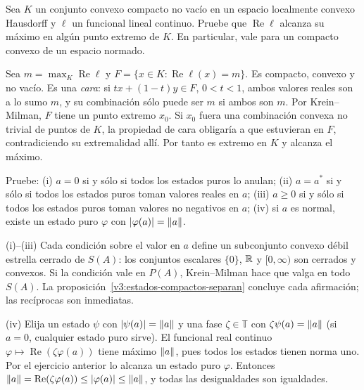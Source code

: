 \begin{ejercicio}\label{ej:v3-l28-5}
Sea $K$ un conjunto convexo compacto no vacío en un espacio localmente convexo Hausdorff y $\ell$ un funcional lineal continuo. Pruebe que $\operatorname{Re}\ell$ alcanza su máximo en algún punto extremo de $K$. En particular, vale para un compacto convexo de un espacio normado.
\end{ejercicio}
\begin{solucion}
Sea $m=\max_K\operatorname{Re}\ell$ y $F=\{x\in K:\operatorname{Re}\ell(x)=m\}$. Es compacto, convexo y no vacío. Es una \emph{cara}: si $tx+(1-t)y\in F$, $0<t<1$, ambos valores reales son a lo sumo $m$, y su combinación sólo puede ser $m$ si ambos son $m$. Por Krein--Milman, $F$ tiene un punto extremo $x_0$. Si $x_0$ fuera una combinación convexa no trivial de puntos de $K$, la propiedad de cara obligaría a que estuvieran en $F$, contradiciendo su extremalidad allí. Por tanto es extremo en $K$ y alcanza el máximo.
\end{solucion}

\begin{ejercicio}\label{ej:v3-l28-6}
Pruebe: (i) $a=0$ si y sólo si todos los estados puros lo anulan; (ii) $a=a^*$ si y sólo si todos los estados puros toman valores reales en $a$; (iii) $a\ge0$ si y sólo si todos los estados puros toman valores no negativos en $a$; (iv) si $a$ es normal, existe un estado puro $\varphi$ con $|\varphi(a)|=\left\lVert a\right\rVert$.
\end{ejercicio}
\begin{solucion}
(i)--(iii) Cada condición sobre el valor en $a$ define un subconjunto convexo débil estrella cerrado de $S(A)$: los conjuntos escalares $\{0\}$, $\mathbb R$ y $[0,\infty)$ son cerrados y convexos. Si la condición vale en $P(A)$, Krein--Milman hace que valga en todo $S(A)$. La proposición~\ref{v3:estados-compactos-separan} concluye cada afirmación; las recíprocas son inmediatas.

(iv) Elija un estado $\psi$ con $|\psi(a)|=\left\lVert a\right\rVert$ y una fase $\zeta\in\mathbb T$ con $\zeta\psi(a)=\left\lVert a\right\rVert$ (si $a=0$, cualquier estado puro sirve). El funcional real continuo $\varphi\mapsto\operatorname{Re}(\zeta\varphi(a))$ tiene máximo $\left\lVert a\right\rVert$, pues todos los estados tienen norma uno. Por el ejercicio anterior lo alcanza un estado puro $\varphi$. Entonces $\left\lVert a\right\rVert=\operatorname{Re}(\zeta\varphi(a))\le|\varphi(a)|\le\left\lVert a\right\rVert$, y todas las desigualdades son igualdades.
\end{solucion}

